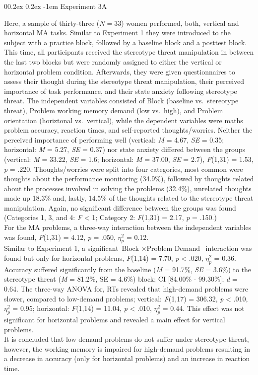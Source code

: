 \documentclass[
  stu]{apa7}
\makeatletter
\let\oldparagraph\paragraph
\renewcommand{\paragraph}[1]{\oldparagraph{#1}\mbox{}}
\renewcommand{\paragraph}{\@startsection{paragraph}{4}{\parindent}%
  {0\baselineskip \@plus 0.2ex \@minus 0.2ex}%
  {-1em}%
  {\normalfont\normalsize\bfseries\itshape\typesectitle}}
\renewcommand{\paragraph}{\@startsection{paragraph}{4}{\parindent}%
  {0\baselineskip \@plus 0.2ex \@minus 0.2ex}%
  {-1em}%
  {\normalfont\normalsize\bfseries\typesectitle}}
\makeatother
\begin{document}
\paragraph{Experiment 3A}\label{experiment-3a}

Here, a sample of thirty-three (\(N = 33\)) women performed, both, vertical and horizontal MA tasks.
Similar to Experiment 1 they were introduced to the subject with a practice block, followed by a baseline block and a posttest block.
This time, all participants received the stereotype threat manipulation in between the last two blocks but were randomly assigned to either the vertical or horizontal problem condition.
Afterwards, they were given questionnaires to assess their thought during the stereotype threat manipulation, their perceived importance of task performance, and their state anxiety following stereotype threat.
The independent variables consisted of Block (baseline vs.~stereotype threat), Problem working memory demand (low vs.~high), and Problem orientation (horiztonal vs.~vertical), while the dependent variables were maths problem accuracy, reaction times, and self-reported thoughts/worries.
Neither the perceived importance of performing well (vertical: \emph{M} = 4.67, \emph{SE} = 0.35; horizontal: \emph{M} = 5.27, \emph{SE} = 0.37) nor state anxiety differed between the groups (vertical: \emph{M} = 33.22, \emph{SE} = 1.6; horizontal: \emph{M} = 37.00, \emph{SE} = 2.7), \emph{F}(1,31) = 1.53, \emph{p} = .220.
Thoughts/worries were split into four categories, most common were thoughts about the performance monitoring (34.9\%), followed by thoughts related about the processes involved in solving the problems (32.4\%), unrelated thoughts made up 18.3\% and, lastly, 14.5\% of the thoughts related to the stereotype threat manipulation.
Again, no significant difference between the groups was found (Categories 1, 3, and 4: \emph{F} \textless{} 1; Category 2: \emph{F}(1,31) = 2.17, \emph{p} = .150.)\\
For the MA problems, a three-way interaction between the independent variables was found, \emph{F}(1,31) = 4.12, \emph{p} = .050, \(\eta^{2}_{p}\) = 0.12.\\
Similar to Experiment 1, a significant \(\text{Block } \times \text{Problem Demand }\) interaction was found but only for horizontal problems, \emph{F}(1,14) = 7.70, \emph{p} \textless{} .020, \(\eta^{2}_{p}\) = 0.36.
Accuracy suffered significantly from the baseline (\emph{M} = 91.7\%, \emph{SE} = 3.6\%) to the stereotype threat (\emph{M} = 81.2\%, SE = 4.6\%) block; CI {[}84.00\% - 99.30\%{]}; \emph{d} = 0.64.
The three-way ANOVA for, RTs revealed that high-demand problems were slower, compared to low-demand problems; vertical: \emph{F}(1,17) = 306.32, \emph{p} \textless{} .010, \(\eta^{2}_{p}\) = 0.95; horizontal: \emph{F}(1,14) = 11.04, \emph{p} \textless{} .010, \(\eta^{2}_{p}\) = 0.44.
This effect was not significant for horizontal problems and revealed a main effect for vertical problems.\\
It is concluded that low-demand problems do not suffer under stereotype threat, however, the working memory is impaired for high-demand problems resulting in a decrease in accuracy (only for horizontal problems) and an increase in reaction time.
\end{document}
